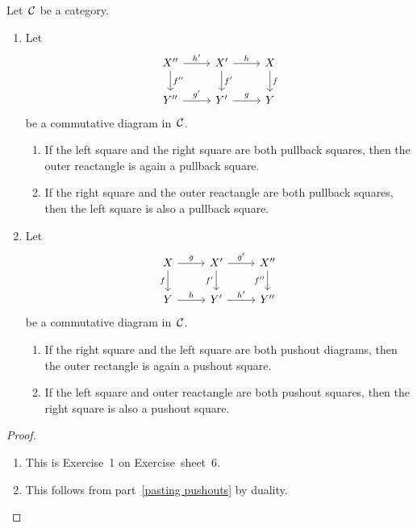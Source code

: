 \begin{lemma*}
  Let~$\mathcal{C}$ be a category.
  \begin{enumerate}
    \item
      Let
      \[
        \begin{tikzcd}
            X''
            \arrow{r}[above]{h'}
            \arrow{d}[right]{f''}
          & X'
            \arrow{r}[above]{h}
            \arrow{d}[right]{f'}
          & X
            \arrow{d}[right]{f}
          \\
            Y''
            \arrow{r}[above]{g'}
          & Y'
            \arrow{r}[above]{g}
          & Y
        \end{tikzcd}
      \]
      be a commutative diagram in~$\mathcal{C}$.
      \begin{enumerate}
        \item
          If the left square and the right square are both pullback squares, then the outer reactangle is again a pullback square.
        \item
          If the right square and the outer reactangle are both pullback squares, then the left square is also a pullback square.
      \end{enumerate}
    \item
      \label{pasting pushouts}
      Let
      \[
        \begin{tikzcd}
            X
            \arrow{r}[above]{g}
            \arrow{d}[left]{f}
          & X'
            \arrow{r}[above]{g'}
            \arrow{d}[left]{f'}
          & X''
            \arrow{d}[left]{f''}
          \\
            Y
            \arrow{r}[above]{h}
          & Y'
            \arrow{r}[above]{h'}
          & Y''
        \end{tikzcd}
      \]
      be a commutative diagram in~$\mathcal{C}$.
      \begin{enumerate}
        \item
          If the right square and the left square are both pushout diagrams, then the outer rectangle is again a pushout square.
        \item
          If the left square and outer reactangle are both pushout squares, then the right square is also a pushout square.
      \end{enumerate}
  \end{enumerate}
\end{lemma*}


\begin{proof}
  \leavevmode
  \begin{enumerate}
    \item
      This is Exercise~1 on Exercise~sheet~6.
    \item
      This follows from part~\ref*{pasting pushouts} by duality.
    \qedhere
  \end{enumerate}
\end{proof}


